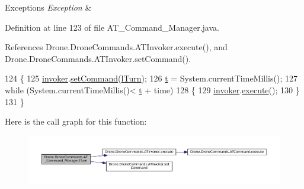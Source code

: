 \begin{DoxyExceptions}{Exceptions}
{\em Exception} & \\
\hline
\end{DoxyExceptions}


Definition at line 123 of file A\+T\+\_\+\+Command\+\_\+\+Manager.\+java.



References Drone.\+Drone\+Commands.\+A\+T\+Invoker.\+execute(), and Drone.\+Drone\+Commands.\+A\+T\+Invoker.\+set\+Command().


\begin{DoxyCode}
124     \{
125         \hyperlink{class_drone_1_1_drone_commands_1_1_a_t___command___manager_a642a1ab26cb9c2df925c2a62d9c15d44}{invoker}.\hyperlink{class_drone_1_1_drone_commands_1_1_a_t_invoker_af32f17db8eb3a66a6f3d05ec7e00ef0b}{setCommand}(\hyperlink{class_drone_1_1_drone_commands_1_1_a_t___command___manager_ad5d87d1abcf6a08d4cd69a2bab032588}{lTurn});
126         \hyperlink{class_drone_1_1_drone_commands_1_1_a_t___command___manager_ae17b2729d7c785eebb2af3ada7069efe}{t} = System.currentTimeMillis();
127         \textcolor{keywordflow}{while} (System.currentTimeMillis()< \hyperlink{class_drone_1_1_drone_commands_1_1_a_t___command___manager_ae17b2729d7c785eebb2af3ada7069efe}{t} + time)
128         \{
129             \hyperlink{class_drone_1_1_drone_commands_1_1_a_t___command___manager_a642a1ab26cb9c2df925c2a62d9c15d44}{invoker}.\hyperlink{class_drone_1_1_drone_commands_1_1_a_t_invoker_a0dfcc8b67f8642820b66411954452d06}{execute}();
130         \}
131     \}
\end{DoxyCode}


Here is the call graph for this function\+:\nopagebreak
\begin{figure}[H]
\begin{center}
\leavevmode
\includegraphics[width=350pt]{class_drone_1_1_drone_commands_1_1_a_t___command___manager_a378e3dccef0b323a01c710976aade5ff_cgraph}
\end{center}
\end{figure}


\hypertarget{class_drone_1_1_drone_commands_1_1_a_t___command___manager_a6e56940306a5cb6d8833d4920d4a6625}{}
